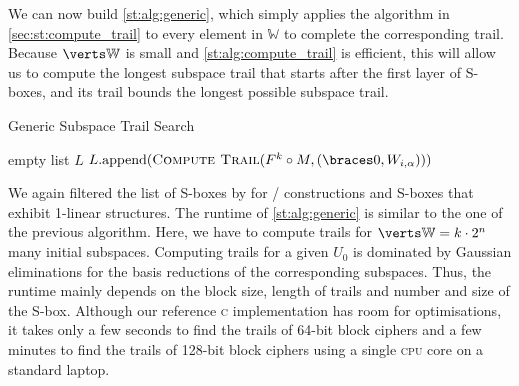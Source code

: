 We can now build \cref{st:alg:generic}, which simply applies the algorithm in \cref{sec:st:compute_trail} to every element in $\mathbb{W}$ to complete the corresponding trail.
Because $\abs{\mathbb{W}}$ is small and \cref{st:alg:compute_trail} is efficient, this will allow us to compute the longest subspace trail that starts after the first layer of S-boxes, and its trail bounds the longest possible subspace trail.
\begin{algorithm}
\caption{Generic Subspace Trail Search}\label{st:alg:generic}
\begin{algorithmic}[1]
    \Statex{}
    \State{}empty list $L$
        \State{}$L.\mathrm{append}(\textsc{Compute Trail}(F^k \circ M, (\set{0}, W_{i,\alpha})))$
    \EndFor{}
    \State{}
    \EndFunction{}
\end{algorithmic}
\end{algorithm}

We again filtered the list of S-boxes by \textcite{PhD:Perrin17} for \SPN/ constructions and S-boxes that exhibit 1-linear structures.
The runtime of \cref{st:alg:generic} is similar to the one of the previous algorithm.
Here, we have to compute trails for $\abs{\mathbb{W}} = k \cdot 2^n$ many initial subspaces.
Computing trails for a given $U_0$ is dominated by Gaussian eliminations for the basis reductions of the corresponding subspaces.
Thus, the runtime mainly depends on the block size, length of trails and number and size of the S-box.
Although our reference \textsc{c} implementation has room for optimisations, it takes only a few seconds to find the trails of 64-bit block ciphers and a few minutes to find the trails of 128-bit block ciphers using a single \textsc{cpu} core on a standard laptop.

